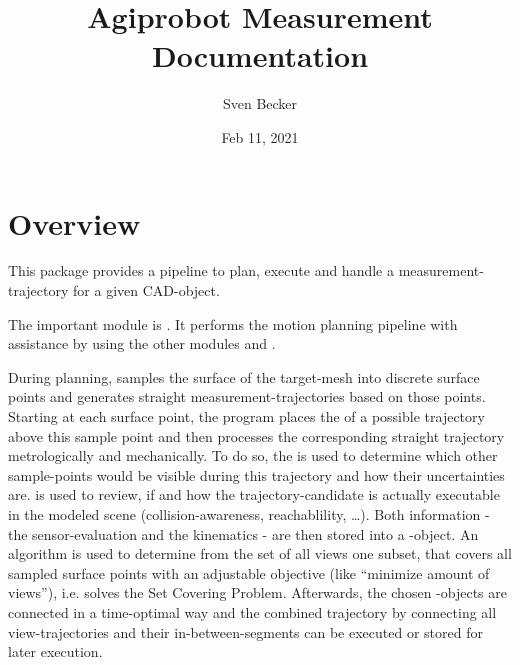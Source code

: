 \documentclass[letterpaper,10pt,english]{sphinxmanual}
\title{Agiprobot Measurement Documentation}
\date{Feb 11, 2021}
\author{Sven Becker}
\begin{document}
\maketitle
\sphinxtableofcontents
{}\label{\detokenize{index::doc}}



\chapter{Overview}
\label{\detokenize{overview:overview}}\label{\detokenize{overview::doc}}\label{\detokenize{overview:agiprobot-measurement-s-documentation}}
This package provides a pipeline to plan, execute and handle a measurement-trajectory for a given CAD-object.

\begin{figure}[htbp]
\centering

\noindent{}
\end{figure}

The important module is {\hyperref[\detokenize{module_trajectory_manager:trajectory-manager}]{}}. It performs the motion planning pipeline with assistance by using the other modules {\hyperref[\detokenize{module_view:view}]{}} and {\hyperref[\detokenize{module_sensor_model:sensor-model}]{}}.

During planning, {\hyperref[\detokenize{module_trajectory_manager:trajectory-manager}]{}} samples the surface of the target-mesh into discrete surface points and generates straight measurement-trajectories based on those points.
Starting at each surface point, the program places the  of a possible trajectory above this sample point and then processes the corresponding straight trajectory metrologically and mechanically.
To do so, the {\hyperref[\detokenize{module_sensor_model:sensor-model}]{}} is used to determine which other sample-points would be visible during this trajectory and how their uncertainties are.  is used to
review, if and how the trajectory-candidate is actually executable in the modeled scene (collision-awareness, reachablility, …). Both information - the sensor-evaluation and the kinematics - are then stored
into a {\hyperref[\detokenize{module_view:view}]{}}-object. An algorithm is used to determine from the set of all views one subset, that covers all sampled surface points with an adjustable objective (like “minimize amount of views”), i.e. solves
the Set Covering Problem.
Afterwards, the chosen {\hyperref[\detokenize{module_view:view}]{}}-objects are connected in a time-optimal way and the combined trajectory by connecting all view-trajectories and their in-between-segments can be executed or stored for later execution.
\end{document}
